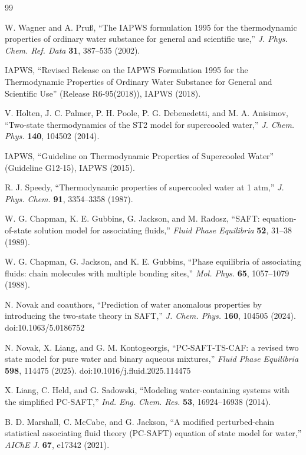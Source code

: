 \documentclass[12pt]{article}
\begin{document}
\begin{thebibliography}{99}

W. Wagner and A. Pru{\ss}, ``The IAPWS formulation 1995 for the thermodynamic properties of ordinary water substance for general and scientific use,'' \textit{J. Phys. Chem. Ref. Data} \textbf{31}, 387--535 (2002).

IAPWS, ``Revised Release on the IAPWS Formulation 1995 for the Thermodynamic Properties of Ordinary Water Substance for General and Scientific Use'' (Release R6-95(2018)), IAPWS (2018).

V. Holten, J. C. Palmer, P. H. Poole, P. G. Debenedetti, and M. A. Anisimov, ``Two-state thermodynamics of the ST2 model for supercooled water,'' \textit{J. Chem. Phys.} \textbf{140}, 104502 (2014).

IAPWS, ``Guideline on Thermodynamic Properties of Supercooled Water'' (Guideline G12-15), IAPWS (2015).

R. J. Speedy, ``Thermodynamic properties of supercooled water at 1 atm,'' \textit{J. Phys. Chem.} \textbf{91}, 3354--3358 (1987).

W. G. Chapman, K. E. Gubbins, G. Jackson, and M. Radosz, ``SAFT: equation-of-state solution model for associating fluids,'' \textit{Fluid Phase Equilibria} \textbf{52}, 31--38 (1989).

W. G. Chapman, G. Jackson, and K. E. Gubbins, ``Phase equilibria of associating fluids: chain molecules with multiple bonding sites,'' \textit{Mol. Phys.} \textbf{65}, 1057--1079 (1988).

N. Novak and coauthors, ``Prediction of water anomalous properties by introducing the two-state theory in SAFT,'' \textit{J. Chem. Phys.} \textbf{160}, 104505 (2024). doi:10.1063/5.0186752

N. Novak, X. Liang, and G. M. Kontogeorgis, ``PC-SAFT-TS-CAF: a revised two state model for pure water and binary aqueous mixtures,'' \textit{Fluid Phase Equilibria} \textbf{598}, 114475 (2025). doi:10.1016/j.fluid.2025.114475

X. Liang, C. Held, and G. Sadowski, ``Modeling water-containing systems with the simplified PC-SAFT,'' \textit{Ind. Eng. Chem. Res.} \textbf{53}, 16924--16938 (2014).

B. D. Marshall, C. McCabe, and G. Jackson, ``A modified perturbed-chain statistical associating fluid theory (PC-SAFT) equation of state model for water,'' \textit{AIChE J.} \textbf{67}, e17342 (2021).


\end{thebibliography}
\end{document}
